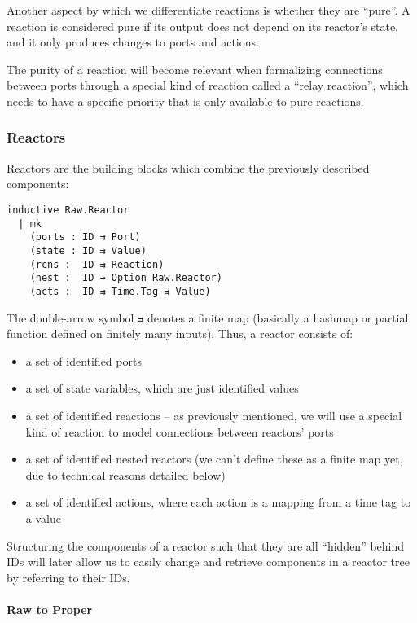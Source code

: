 Another aspect by which we differentiate reactions is whether they are ``pure''.
A reaction is considered pure if its output does not depend on its reactor's state, and it only produces changes to ports and actions.

The purity of a reaction will become relevant when formalizing connections between ports through a special kind of reaction called a ``relay reaction'', which needs to have a specific priority that is only available to pure reactions. 

\subsubsection{Reactors}

Reactors are the building blocks which combine the previously described components:

\begin{lstlisting}
inductive Raw.Reactor 
  | mk 
    (ports : ID ⇉ Port)
    (state : ID ⇉ Value)
    (rcns :  ID ⇉ Reaction)
    (nest :  ID → Option Raw.Reactor)
    (acts :  ID ⇉ Time.Tag ⇉ Value)
\end{lstlisting}

The double-arrow symbol \lstinline{⇉} denotes a finite map (basically a hashmap or partial function defined on finitely many inputs).
Thus, a reactor consists of:

\begin{itemize}
    \item a set of identified ports
    \item a set of state variables, which are just identified values
    \item a set of identified reactions -- as previously mentioned, we will use a special kind of reaction to model connections between reactors' ports
    \item a set of identified nested reactors (we can't define these as a finite map yet, due to technical reasons detailed below)
    \item a set of identified actions, where each action is a mapping from a time tag to a value
\end{itemize}

Structuring the components of a reactor such that they are all ``hidden'' behind IDs will later allow us to easily change and retrieve components in a reactor tree by referring to their IDs.

\paragraph{Raw to Proper}

